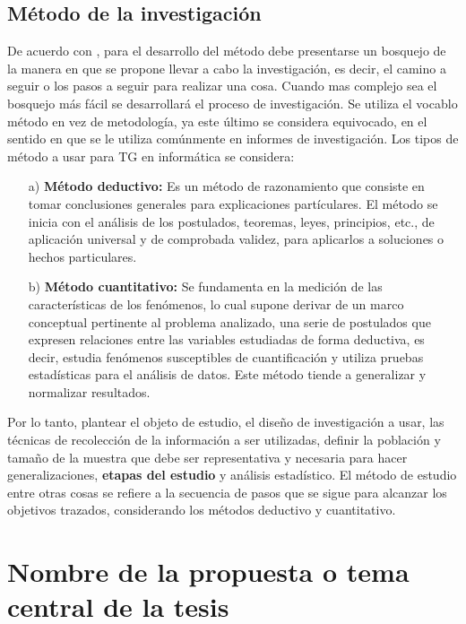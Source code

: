 \section{Método de la investigación}
De acuerdo con \cite{Erica}, para el desarrollo del método debe presentarse un bosquejo de la manera  en que se propone llevar a cabo la investigación, es decir, el camino a seguir o los pasos a seguir para realizar una cosa. Cuando mas complejo sea el bosquejo  más fácil se desarrollará el proceso de investigación. Se utiliza el vocablo método en vez de metodología, ya este último se considera equivocado, en el sentido en que se le utiliza comúnmente en informes de investigación. 
\vskip 0.3cm
Los tipos de método a usar para TG en informática se considera:
\begin{enumerate}
\item[a)] {\bf Método deductivo:} Es un método de razonamiento que consiste en tomar conclusiones generales para explicaciones partículares. El método se inicia con el análisis de los postulados, teoremas, leyes, principios, etc., de aplicación universal y de comprobada validez, para aplicarlos  a soluciones o hechos particulares. 

\item[b)]{\bf Método cuantitativo:} Se fundamenta en la medición de las características de los fenómenos, lo cual supone derivar de un marco conceptual pertinente al problema analizado, una serie de postulados que expresen relaciones entre las variables estudiadas de forma deductiva, es decir, estudia fenómenos susceptibles de cuantificación y utiliza pruebas estadísticas para el análisis de datos. Este método tiende a generalizar y normalizar resultados. 
\end{enumerate}

Por lo tanto, plantear el objeto de estudio, el diseño de investigación a usar, las técnicas de recolección de la información a ser utilizadas, definir la población y tamaño de la muestra que debe ser representativa y necesaria para hacer generalizaciones, {\bf etapas del estudio} y análisis estadístico. El método de estudio entre otras cosas se refiere a la secuencia de pasos que se sigue para alcanzar los objetivos trazados, considerando los métodos deductivo y cuantitativo.\par




\chapter{Nombre de la propuesta o tema central de la tesis}

